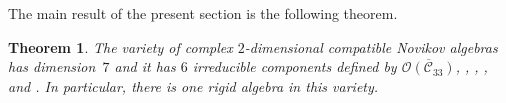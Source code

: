 \documentclass[10pt,a4paper]{amsart}
\numberwithin{equation}{section}
\newtheorem{Theorem}{Theorem}[section]
\begin{document}
The main result of the present section is the following theorem.

\begin{Theorem}\label{geo1}
The variety of complex $2$-dimensional compatible Novikov algebras has
dimension~$7$ and it has $6$ irreducible components defined by
$ \overline{\mathcal{O}( \mathcal{C}_{33})}$,
,
,
,
 and
.
In particular, there is one rigid algebra in this variety.

\end{Theorem}
\end{document}

